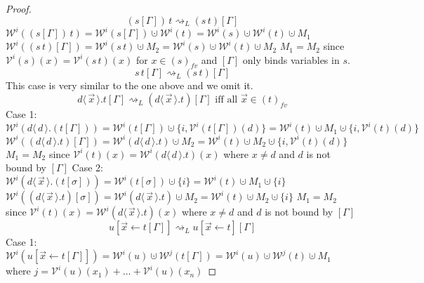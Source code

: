 \documentclass[a4paper,UKenglish,cleveref, autoref]{lipics-v2019}
\newcommand{\fv}[1]{(#1)_{fv}}
\newcommand{\set}[1]{ \{ #1 \} }
\newcommand{\app}[2]{#1 \, #2}
\newcommand{\fake}[3]{#1 \langle \, #2 \, \rangle . #3}
\newcommand{\share}[3]{#1 [#2 \leftarrow #3]}
\newcommand{\weight}[2]{\mathcal{W}^{#1}(#2)}
\newcommand{\weightvar}[2]{\mathcal{V}^{#1}(#2)}
\begin{document}
\begin{proof}
$$\app{(s[\Gamma])}{t} \rightsquigarrow_{L} (\app{s}{t})[\Gamma]$$
$\weight{i}{\app{(s[\Gamma])}{t}} = \weight{i}{s[\Gamma]} \cupdot \weight{i}{t} = \weight{i}{s} \cupdot \weight{i}{t} \cupdot M_{1}$
\newline
$\weight{i}{ (\app{s}{t})[\Gamma]} = \weight{i}{\app{s}{t}} \cupdot M_{2} = \weight{i}{s} \cupdot \weight{i}{t} \cupdot M_{2}$
\newline
$M_{1} = M_{2}$ since $\weightvar{i}{s}(x) = \weightvar{i}{\app{s}{t}}(x)$ for $x \in \fv{s}$ and $[\Gamma]$ only binds variables in $s$.
\newline
$$\app{s}{t[\Gamma]} \rightsquigarrow_{L} (\app{s}{t})[\Gamma]$$
This case is very similar to the one above and we omit it.
\newline
$$\fake{d}{\vec{x}}{t[\Gamma]} \rightsquigarrow_{L} (\fake{d}{\vec{x}}{t})[\Gamma] \text{ iff all $\vec{x} \in \fv{t}$}$$
Case 1:
\newline
$\weight{i}{\fake{d}{d}{(t[\Gamma])}} = \weight{i}{t[\Gamma]} \cupdot \set{i, \weightvar{i}{t[\Gamma]}(d)} = \weight{i}{t} \cupdot M_{1} \cupdot \set{i, \weightvar{i}{t}(d)}$
\newline
$\weight{i}{(\fake{d}{d}{t})[\Gamma]} = \weight{i}{\fake{d}{d}{t}} \cupdot M_{2} =  \weight{i}{t} \cupdot M_{2} \cupdot \set{i, \weightvar{i}{t}(d)}$
\newline
$M_{1} = M_{2}$ since $\weightvar{i}{t}(x) = \weight{i}{\fake{d}{d}{t}}(x)$ where $x \neq d$ and $d$ is not bound by $[\Gamma]$
\newline
Case 2:
\newline
$\weight{i}{\fake{d}{\vec{x}}{(t[\sigma])}} = \weight{i}{t[\sigma]} \cupdot \set{i} = \weight{i}{t} \cupdot M_{1} \cupdot \set{i}$
\newline
$\weight{i}{(\fake{d}{\vec{x}}{t})[\sigma]} = \weight{i}{\fake{d}{\vec{x}}{t}} \cupdot M_{2} =  \weight{i}{t} \cupdot M_{2} \cupdot \set{i}$
\newline
$M_{1} = M_{2}$ since $\weightvar{i}{t}(x) = \weight{i}{\fake{d}{\vec{x}}{t}}(x)$ where $x \neq d$ and $d$ is not bound by $[\Gamma]$
\newline
$$\share{u}{\vec{x}}{t[\Gamma]} \rightsquigarrow_{L} \share{u}{\vec{x}}{t}[\Gamma]$$
Case 1:
\newline
$\weight{i}{\share{u}{\vec{x}}{t[\Gamma]}} = \weight{i}{u} \cupdot \weight{j}{t[\Gamma]} = \weight{i}{u} \cupdot \weight{j}{t} \cupdot M_{1}$
\newline
where $j = \weightvar{i}{u}(x_{1}) + \dots +  \weightvar{i}{u}(x_{n})$
\newline

\end{proof}
\end{document}
